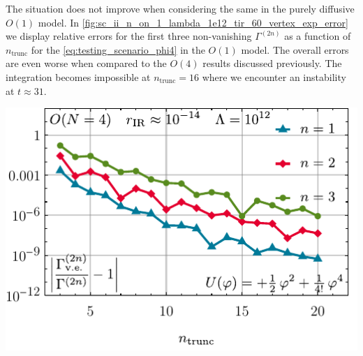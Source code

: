 The situation does not improve when considering the same \ic{} in the purely diffusive $O(1)$ model.
In \cref{fig:sc_ii_n_on_1_lambda_1e12_tir_60_vertex_exp_error} we display relative errors for the first three non-vanishing $\Gamma^{(2n)}$ as a function of $n_\mathrm{trunc}$ for the \ic{} \eqref{eq:testing_scenario_phi4} in the $O(1)$ model.
The overall errors are even worse when compared to the $O(4)$ results discussed previously.
The \ode{} integration becomes impossible at $n_\mathrm{trunc} = 16$ where we encounter an instability at $t \approx 31$.

	{\includegraphics[width=\subcaptionFigureWidth]{0d/figures/sc_ii_p_on_4_lambda_1e12_tir_60_vertex_exp_error.pdf}}%
